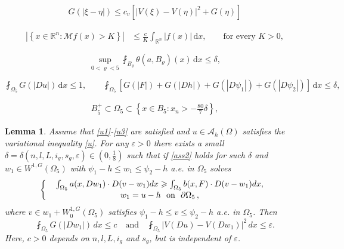 \documentclass[10pt,a4paper]{amsart}
\newtheorem{lemma}{Lemma}
\begin{document}
 \begin{align}\label{cv}
G(|\xi-\eta|)\leqslant c_v \left[ |V(\xi) - V(\eta)|^2+G(\eta)\right] 
	\end{align}

\begin{align}\label{one}
	\left|\left\{ x\in\mathbb{R}^n : \mathcal{M}f(x) > K \right\}\right|
	&\leq \frac{c}{K} \int_{\mathbb{R}^n}|f(x)|\,\mathrm{d}x,
	\qquad \text{for every } K>0,
\end{align}

\begin{equation}\label{ass1}
  \sup_{0<\varrho<5} \fint_{B_\varrho} \theta(a, B_\varrho)(x) \, \mathrm{d}x \leq \delta,
\end{equation}

\begin{equation}\label{ass2}
\fint_{\Omega_5} G(|Du|) \, \mathrm{d}x \leq 1, \qquad \fint_{\Omega_5}\left[  G(|F|)+G(|Dh|)+G(|D\psi_1|)+G(|D\psi_2|)\right]  \, \mathrm{d}x \leq \delta,
\end{equation}

\begin{align}\label{ass3}
 B_5^+ \subset \Omega_5 \subset \left\{ x \in B_5 : x_n > -\frac{80}{7}\delta \right\},
\end{align}

\begin{lemma}\label{uw1}
	 Assume that \eqref{u1}-\eqref{u3} are satisfied and   $u \in \mathcal{A}_{h}(\Omega)$   satisfies the variational inequality \eqref{u}.
	 For any $\varepsilon > 0$ there exists a small $\delta=\delta(n,l,L,i_g,s_g,\varepsilon) \in (0,\frac{1}{8})$ such that if \eqref{ass2} holds for such $\delta$ and  $w_1 \in W^{1,G}(\Omega_5)$ with $\psi_1-h\leqslant w_1\leqslant \psi_2-h $ a.e. in $\Omega_5$ solves
	 \begin{equation}\label{w1}
	 	\left\{\begin{array}{r@{\ \ }c@{\ \ }ll}
	 		&\int_{\Omega_5}  a(x,  Dw_1) \cdot D(v-w_1)dx \geqslant \int_{\Omega_5}  b(x, F) \cdot D(v-w_1)dx,  \\[0.05cm]
	 		&w_1=u-h \ \ \mbox{on}\ \ \partial \Omega_5 \,,
	 	\end{array}\right.
	 \end{equation}
	where $v\in w_1+W_0^{1,G}(\Omega_5)$ satisfies $\psi_1-h \leqslant v \leqslant \psi_2-h$ a.e. in $\Omega_5$.
	Then
	\begin{equation}\label{vuw1}
		\fint_{\Omega_5} G(|Dw_1|)\,dx \leq c \quad \text{and} \quad \fint_{\Omega_5} |V(Du)-V(Dw_1)|^2\,dx \leq \varepsilon.  
	\end{equation}
	Here, $c > 0$ depends on $n,l,L,i_g$ and $s_g$, but is independent of $\varepsilon$.
	
\end{lemma}
\end{document}
